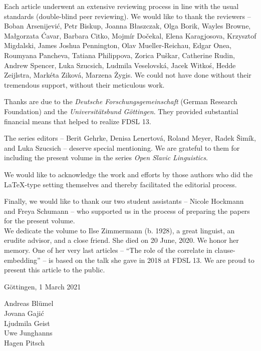 \largerpage[-1]

Each article underwent an extensive reviewing process in line with the usual standards (double-blind peer reviewing). We would like to thank the reviewers -- Boban Arsenijević, Petr Biskup, Joanna Błaszczak, Olga Borik, Wayles Browne, Małgorzata Ćavar, Barbara Citko, Mojmír Dočekal, Elena Karagjosova, Krzysztof Migdalski, James Joshua Pennington, Olav Mueller-Reichau, Edgar Onea, Roum\-yana Pancheva, Tatiana Philippova, Zorica Puškar, Catherine Rudin, Andrew Spencer, Luka Szucsich, Ludmila Veselovská, Jacek Witkoś, Hedde Zeijlstra, \linebreak Markéta Ziková, Marzena Żygis. We could not have done without their tremendous support, without their meticulous work.

Thanks are due to the \textit{Deutsche Forschungsgemeinschaft} (German Research Foundation) and the \textit{Universitätsbund Göttingen}. They provided substantial financial means that helped to realize FDSL 13.

The series editors -- Berit Gehrke, Denisa Lenertová, Roland Meyer, Radek Šimík, and Luka Szucsich -- deserve special mentioning. We are grateful to them for including the present volume in the series \textit{Open Slavic Linguistics}.

We would like to acknowledge the work and efforts by those authors who did the \LaTeX-type setting themselves and thereby facilitated the editorial process.

Finally, we would like to thank our two student assistants -- Nicole Hockmann and Freya Schumann -- who supported us in the process of preparing the papers for the present volume.\\

\noindent We dedicate the volume to Ilse Zimmermann (b. 1928), a great linguist, an erudite advisor, and a close friend. She died on 20 June, 2020. We honor her memory. One of her very last articles – ``The role of the correlate in clause-embedding'' – is based on the talk she gave in 2018 at FDSL 13. We are proud to present this article to the public.

\null\hfill Göttingen, 1 March 2021

\null\hfill Andreas Blümel\\
\null\hfill Jovana Gajić\\
\null\hfill Ljudmila Geist\\
\null\hfill Uwe Junghanns\\
\null\hfill Hagen Pitsch\\

% 
